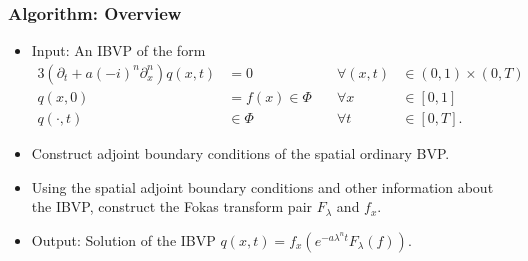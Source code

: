 \documentclass{beamer}
\begin{document}
\begin{frame}
    \frametitle{Algorithm: Overview}
    \begin{itemize}
        \item Input: An IBVP of the form
            \begin{alignat*}{3}
                \left(\partial_t + a(-i)^n \partial_x^n \right)q(x,t) &= 0\quad &\forall (x,t)&\in (0,1)\times (0,T) \\
                q(x,0) &= f(x)\in \Phi\quad &\forall x&\in [0,1]\\
                q(\cdot, t) &\in \Phi \quad &\forall t&\in [0,T].
            \end{alignat*}
        \item Construct adjoint boundary conditions of the spatial ordinary BVP.
        \item Using the spatial adjoint boundary conditions and other information about the IBVP, construct the Fokas transform pair $F_\lambda$ and $f_x$.
        \item Output: Solution of the IBVP $q(x,t) = f_x(e^{-a\lambda^n t}F_\lambda(f))$.
    \end{itemize}
\end{frame}



    
\end{document}
